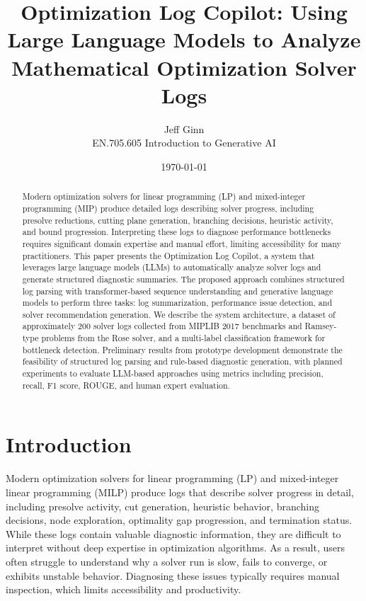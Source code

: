 \documentclass[11pt]{article}
\title{Optimization Log Copilot: Using Large Language Models to Analyze Mathematical Optimization Solver Logs}
\author{Jeff Ginn \\ EN.705.605 Introduction to Generative AI}
\date{\today}
\begin{document}
\maketitle

\begin{abstract}
Modern optimization solvers for linear programming (LP) and mixed-integer programming (MIP) produce detailed logs describing solver progress, including presolve reductions, 
cutting plane generation, branching decisions, heuristic activity, and bound progression. Interpreting these logs to diagnose performance bottlenecks requires significant 
domain expertise and manual effort, limiting accessibility for many practitioners. This paper presents the Optimization Log Copilot, a system that leverages large language models (LLMs) 
to automatically analyze solver logs and generate structured diagnostic summaries. The proposed approach combines structured log parsing with transformer-based sequence understanding 
and generative language models to perform three tasks: log summarization, performance issue detection, and solver recommendation generation. We describe the system architecture, 
a dataset of approximately 200 solver logs collected from MIPLIB 2017 benchmarks and Ramsey-type problems from the Rose solver, and a multi-label classification framework for bottleneck detection. 
Preliminary results from prototype development demonstrate the feasibility of structured log parsing and rule-based diagnostic generation, with planned experiments to evaluate LLM-based 
approaches using metrics including precision, recall, F1 score, ROUGE, and human expert evaluation.
\end{abstract}

\section{Introduction}
\label{sec:intro}

Modern optimization solvers for linear programming (LP) and mixed-integer linear programming (MILP) produce logs that describe solver progress in detail, including presolve activity, 
cut generation, heuristic behavior, branching decisions, node exploration, optimality gap progression, and termination status. While these logs contain valuable diagnostic 
information, they are difficult to interpret without deep expertise in optimization algorithms. As a result, users often struggle to understand why a solver run is slow, 
fails to converge, or exhibits unstable behavior. Diagnosing these issues typically requires manual inspection, which limits accessibility and productivity.
\end{document}

